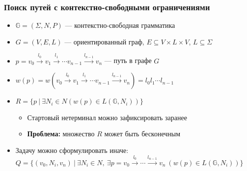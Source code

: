 \documentclass[xcolor=table,aspectratio=169]{beamer}
\begin{document}
\begin{frame}[fragile]
  \transwipe[direction=90]
  \frametitle{Поиск путей с контекстно-свободными ограничениями}
  \begin{itemize}
  \item $\mathbb{G} = (\Sigma, N, P)$ --- контекстно-свободная грамматика
  \item $G = (V,E,L)$ --- ориентированный граф, $E \subseteq V\times L \times V$, $L\subseteq \Sigma$
  \item $p = v_0 \xrightarrow{l_0} v_1 \xrightarrow{l_1} \cdots v_{n-1}\xrightarrow{l_{n-1}}v_n$ --- путь в графе $G$
  \item $w(p) = w(v_0 \xrightarrow{l_0} v_1 \xrightarrow{l_1} \cdots v_{n-1}\xrightarrow{l_{n-1}}v_n) = l_0 l_1 \cdots l_{n-1}$
  \item $R =\{ p \ | \ \exists N_i \in N (w(p) \in L(\mathbb{G},N_i))\}$
  \begin{itemize}
    \item Стартовый нетерминал можно зафиксировать заранее
    \item \textbf{Проблема:} множество $R$ может быть бесконечным
  \end{itemize}
  \item Задачу можно сформулировать иначе: $Q =\{ (v_0,N_i,v_n) \ | \ \exists N_i \in N, \ \exists p = v_0 \xrightarrow{l_0} \cdots \xrightarrow{l_{n-1}}v_n \ (w(p) \in 
  L(\mathbb{G},N_i))\}$
  \end{itemize}
\end{frame}
\end{document}
